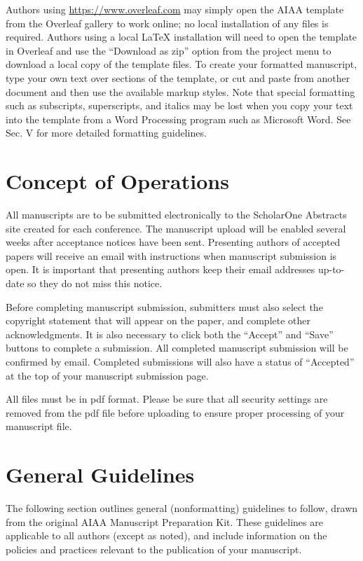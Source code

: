 \documentclass[conf]{new-aiaa}
\begin{document}
Authors using \url{https://www.overleaf.com} may simply open the AIAA template from the Overleaf gallery to work online; no local installation of any files is required. Authors using a local \LaTeX{} installation will need to open the template in Overleaf and use the ``Download as zip'' option from the project menu to download a local copy of the template files. To create your formatted manuscript, type your own text over sections of the template, or cut and paste from another document and then use the available markup styles. Note that special formatting such as subscripts, superscripts, and italics may be lost when you copy your text into the template from a Word Processing program such as Microsoft Word. See Sec. V for more detailed formatting guidelines.

\section{Concept of Operations}

All manuscripts are to be submitted electronically to the ScholarOne Abstracts site created for each conference. The manuscript upload will be enabled several weeks after acceptance notices have been sent. Presenting authors of accepted papers will receive an email with instructions when manuscript submission is open. It is important that presenting authors keep their email addresses up-to- date so they do not miss this notice.

Before completing manuscript submission, submitters must also select the copyright statement that will appear on the paper, and complete other acknowledgments. It is also necessary to click both the ``Accept'' and ``Save'' buttons to complete a submission. All completed manuscript submission will be confirmed by email. Completed submissions will also have a status of ``Accepted'' at the top of your manuscript submission page.

All files must be in pdf format. Please be sure that all security settings are removed from the pdf file before uploading to ensure proper processing of your manuscript file.

\section{General Guidelines}

The following section outlines general (nonformatting) guidelines to follow, drawn from the original AIAA Manuscript Preparation Kit. These guidelines are applicable to all authors (except as noted), and include information on the policies and practices relevant to the publication of your manuscript.
\end{document}
